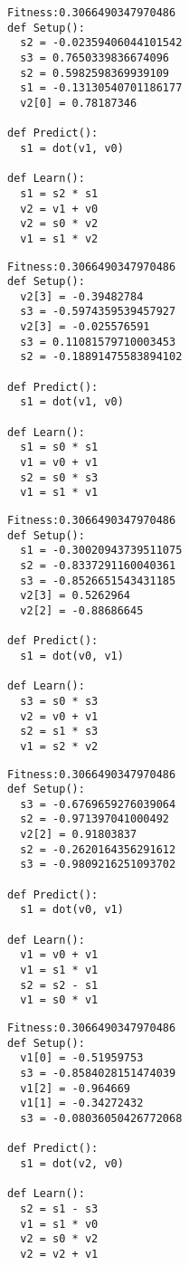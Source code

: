 \documentclass[twocolumn, a4j]{jarticle}
\begin{document}
\begin{lstlisting}[caption= No. 5.26]
Fitness:0.3066490347970486 
def Setup():
  s2 = -0.02359406044101542
  s3 = 0.7650339836674096
  s2 = 0.5982598369939109
  s1 = -0.13130540701186177
  v2[0] = 0.78187346

def Predict():
  s1 = dot(v1, v0)

def Learn():
  s1 = s2 * s1
  v2 = v1 + v0
  v2 = s0 * v2
  v1 = s1 * v2

\end{lstlisting}

\newpage

\begin{lstlisting}[caption= No. 5.27]
Fitness:0.3066490347970486 
def Setup():
  v2[3] = -0.39482784
  s3 = -0.5974359539457927
  v2[3] = -0.025576591
  s3 = 0.11081579710003453
  s2 = -0.18891475583894102

def Predict():
  s1 = dot(v1, v0)

def Learn():
  s1 = s0 * s1
  v1 = v0 + v1
  s2 = s0 * s3
  v1 = s1 * v1

\end{lstlisting}

\begin{lstlisting}[caption= No. 5.28]
Fitness:0.3066490347970486 
def Setup():
  s1 = -0.30020943739511075
  s2 = -0.8337291160040361
  s3 = -0.8526651543431185
  v2[3] = 0.5262964
  v2[2] = -0.88686645

def Predict():
  s1 = dot(v0, v1)

def Learn():
  s3 = s0 * s3
  v2 = v0 + v1
  s2 = s1 * s3
  v1 = s2 * v2

\end{lstlisting}

\newpage

\begin{lstlisting}[caption= No. 5.29]
Fitness:0.3066490347970486 
def Setup():
  s3 = -0.6769659276039064
  s2 = -0.971397041000492
  v2[2] = 0.91803837
  s2 = -0.2620164356291612
  s3 = -0.9809216251093702

def Predict():
  s1 = dot(v0, v1)

def Learn():
  v1 = v0 + v1
  v1 = s1 * v1
  s2 = s2 - s1
  v1 = s0 * v1

\end{lstlisting}

\begin{lstlisting}[caption= No. 5.30]
Fitness:0.3066490347970486 
def Setup():
  v1[0] = -0.51959753
  s3 = -0.8584028151474039
  v1[2] = -0.964669
  v1[1] = -0.34272432
  s3 = -0.08036050426772068

def Predict():
  s1 = dot(v2, v0)

def Learn():
  s2 = s1 - s3
  v1 = s1 * v0
  v2 = s0 * v2
  v2 = v2 + v1

\end{lstlisting}

\newpage

\newpage
\end{document}
